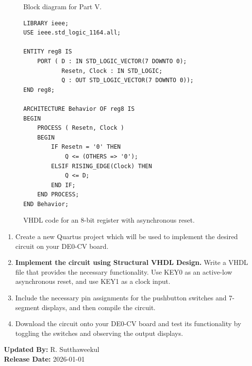 \documentclass{article}
\begin{document}
\begin{figure}[H]
    \centering
    
    \caption{Block diagram for Part V.}
    \label{fig:part5_block_diagram}
\end{figure}

\begin{figure}[H]
    \centering
    \begin{verbatim}
LIBRARY ieee;
USE ieee.std_logic_1164.all;

ENTITY reg8 IS
    PORT ( D : IN STD_LOGIC_VECTOR(7 DOWNTO 0);
           Resetn, Clock : IN STD_LOGIC;
           Q : OUT STD_LOGIC_VECTOR(7 DOWNTO 0));
END reg8;

ARCHITECTURE Behavior OF reg8 IS
BEGIN
    PROCESS ( Resetn, Clock )
    BEGIN
        IF Resetn = '0' THEN
            Q <= (OTHERS => '0');
        ELSIF RISING_EDGE(Clock) THEN
            Q <= D;
        END IF;
    END PROCESS;
END Behavior;
    \end{verbatim}
    \caption{VHDL code for an 8-bit register with asynchronous reset.}
    \label{fig:vhdl_reg8}
\end{figure}

\begin{enumerate}
    \item Create a new Quartus project which will be used to implement the desired circuit on your DE0-CV board.
    \item \textbf{Implement the circuit using Structural VHDL Design.} Write a VHDL file that provides the necessary functionality. Use KEY0 as an active-low asynchronous reset, and use KEY1 as a clock input.
    \item Include the necessary pin assignments for the pushbutton switches and 7-segment displays, and then compile the circuit.
    \item Download the circuit onto your DE0-CV board and test its functionality by toggling the switches and observing the output displays.
\end{enumerate}

\vspace{1cm}
\noindent \textbf{Updated By:} R. Sutthaweekul \\
\textbf{Release Date:} 2026-01-01
\end{document}
